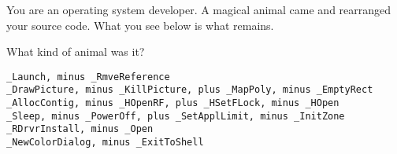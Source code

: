 \documentclass{puzz}
\begin{document}

You are an operating system developer. A magical animal came and rearranged
your source code. What you see below is what remains.

What kind of animal was it?

\begin{verbatim}
_Launch, minus _RmveReference
_DrawPicture, minus _KillPicture, plus _MapPoly, minus _EmptyRect
_AllocContig, minus _HOpenRF, plus _HSetFLock, minus _HOpen
_Sleep, minus _PowerOff, plus _SetApplLimit, minus _InitZone
_RDrvrInstall, minus _Open
_NewColorDialog, minus _ExitToShell
\end{verbatim}
\end{document}
